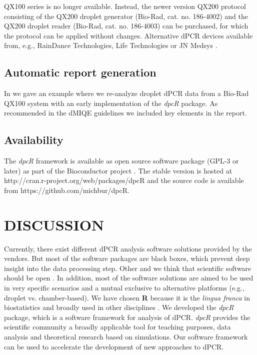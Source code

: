 \documentclass[a4,center,fleqn]{NAR}
\begin{document}
QX100 series is no longer available. Instead, the newer version QX200 protocol 
consisting of the QX200 droplet generator (Bio-Rad, cat. no. 186-4002) and the 
QX200 droplet reader (Bio-Rad, cat. no. 186-4003) can be purchased, for which 
the protocol can be applied without changes. Alternative dPCR devices available 
from, e.g., RainDance Technologies, Life Technologies or JN Medsys 
\citep{mock_digital_2016}.

\subsection{Automatic report generation}

In \cite{rodiger_r_2015} we gave an example where we re-analyze droplet dPCR 
data from a Bio-Rad QX100 system with an early implementation of the 
\textit{dpcR} package. As recommended in the dMIQE guidelines 
\cite{huggett_digital_2013} we included key elements in the report.

\subsection{Availability}

The \textit{dpcR} framework is available as open source software package (GPL-3 
or later) as part of the Bioconductor project \cite{gentleman_2004}. The stable 
version is hosted at http://cran.r-project.org/web/packages/dpcR and the source 
code is available from  https://github.com/michbur/dpcR.

\section{DISCUSSION}

Currently, there exist different dPCR analysis software solutions provided by 
the vendors. But most of the software packages are black boxes, which 
prevent deep insight into the data processing step. Other and we think that 
scientific software should be open \cite{ince_case_2012, 
rodiger_r_2015}. In addition, most of the software solutions are aimed to be 
used in very specific scenarios and a mutual exclusive to alternative platforms 
(e.g., droplet vs. chamber-based). We have chosen \textbf{R} because it is the 
\textit{lingua franca} in biostatistics and broadly used in other disciplines 
\cite{rodiger_r_2015}. We developed the \textit{dpcR} package, which is a 
software framework for analysis of dPCR. \textit{dpcR} provides the scientific 
community a broadly applicable tool for teaching purposes, data analysis and 
theoretical research based on simulations. Our software framework can be used 
to 
accelerate the development of new approaches to dPCR.
\end{document}
